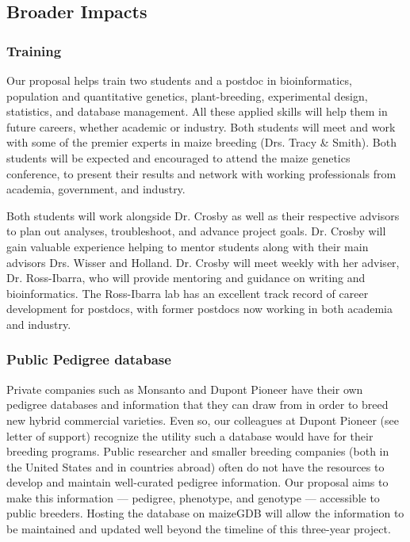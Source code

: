 \documentclass[12pt]{article}
\begin{document}
\subsection*{Broader Impacts}

\subsubsection*{Training}
Our proposal helps train two students and a postdoc in bioinformatics, population and quantitative genetics, plant-breeding, experimental design, statistics, and database management. 
All these applied skills will help them in future careers, whether academic or industry. 
Both students will meet and work with some of the premier experts in maize breeding (Drs. Tracy \& Smith).
Both students will be expected and encouraged to attend the maize genetics conference, to present their results and network with working professionals from academia, government, and industry.

Both students will work alongside Dr. Crosby as well as their respective advisors to plan out analyses, troubleshoot, and advance project goals. 
Dr. Crosby will gain valuable experience helping to mentor students along with their main advisors Drs. Wisser and Holland. 
Dr. Crosby will meet weekly with her adviser, Dr. Ross-Ibarra, who will provide mentoring and guidance on writing and bioinformatics.
The Ross-Ibarra lab has an excellent track record of career development for postdocs, with former postdocs now working in both academia and industry.

\subsubsection*{Public Pedigree database}
Private companies such as Monsanto and Dupont Pioneer have their own pedigree databases and information that they can draw from in order to breed new hybrid commercial varieties. 
Even so, our colleagues at Dupont Pioneer (see letter of support) recognize the utility such a database would have for their breeding programs.
Public researcher and smaller breeding companies  (both in the United States and in countries abroad) often do not have the resources to develop and maintain well-curated pedigree information. 
Our proposal aims to make this information --- pedigree, phenotype, and genotype --- accessible to public breeders.
Hosting the database on maizeGDB will allow the information to be maintained and updated well beyond the timeline of this three-year project.
\end{document}
